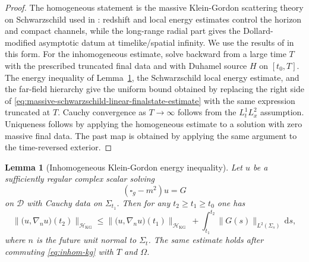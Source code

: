 \documentclass[11pt]{article}
\numberwithin{equation}{section}
\theoremstyle{plain}
\newtheorem{lemma}[theorem]{Lemma}
\theoremstyle{definition}
\theoremstyle{remark}
\newcommand{\D}{\mathcal{D}}
\newcommand{\dd}{\mathrm{d}}
\begin{document}
\begin{proof}
The homogeneous statement is the massive Klein-Gordon scattering theory on Schwarzschild used in \cite{Dimock,BachelotKG}: redshift and local energy estimates control the horizon and compact channels, while the long-range radial part gives the Dollard-modified asymptotic datum at timelike/spatial infinity.  We use the results of \cite{Dimock,BachelotKG} in this form.  For the inhomogeneous estimate, solve backward from a large time $T$ with the prescribed truncated final data and with Duhamel source $H$ on $[t_0,T]$.  The energy inequality of Lemma~\ref{lem:inhom-kg-energy}, the Schwarzschild local energy estimate, and the far-field hierarchy give the uniform bound obtained by replacing the right side of \eqref{eq:massive-schwarzschild-linear-finalstate-estimate} with the same expression truncated at $T$.  Cauchy convergence as $T\to\infty$ follows from the $L_t^1L_x^2$ assumption.  Uniqueness follows by applying the homogeneous estimate to a solution with zero massive final data.  The past map is obtained by applying the same argument to the time-reversed exterior.
\end{proof}

\begin{lemma}[Inhomogeneous Klein-Gordon energy inequality]\label{lem:inhom-kg-energy}
Let $u$ be a sufficiently regular complex scalar solving
\begin{equation}\label{eq:inhom-kg}
(\square_g-m^{2})u=G
\end{equation}
on $\D$ with Cauchy data on $\Sigma_{t_1}$.
Then for any $t_2\ge t_1\ge t_0$ one has
\begin{equation}\label{eq:inhom-kg-energy-est}
\|\bigl(u,\nabla_{n}u\bigr)(t_2)\|_{\mathcal H_{\mathrm{KG}}}
\le
\|\bigl(u,\nabla_{n}u\bigr)(t_1)\|_{\mathcal H_{\mathrm{KG}}}
\ +
\int_{t_1}^{t_2}\|G(s)\|_{L^{2}(\Sigma_s)}\,\dd s,
\end{equation}
where $n$ is the future unit normal to $\Sigma_t$.
The same estimate holds after commuting \eqref{eq:inhom-kg} with $T$ and $\Omega$.
\end{lemma}
\end{document}
